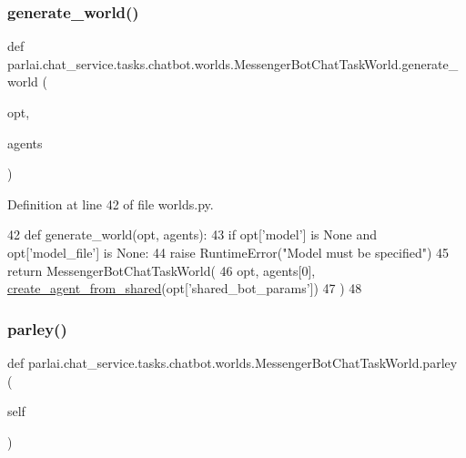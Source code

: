 \subsubsection{\texorpdfstring{generate\+\_\+world()}{generate\_world()}}
{\footnotesize\ttfamily def parlai.\+chat\+\_\+service.\+tasks.\+chatbot.\+worlds.\+Messenger\+Bot\+Chat\+Task\+World.\+generate\+\_\+world (\begin{DoxyParamCaption}\item[{}]{opt,  }\item[{}]{agents }\end{DoxyParamCaption})\hspace{0.3cm}{\ttfamily [static]}}



Definition at line 42 of file worlds.\+py.


\begin{DoxyCode}
42     \textcolor{keyword}{def }generate\_world(opt, agents):
43         \textcolor{keywordflow}{if} opt[\textcolor{stringliteral}{'model'}] \textcolor{keywordflow}{is} \textcolor{keywordtype}{None} \textcolor{keywordflow}{and} opt[\textcolor{stringliteral}{'model\_file'}] \textcolor{keywordflow}{is} \textcolor{keywordtype}{None}:
44             \textcolor{keywordflow}{raise} RuntimeError(\textcolor{stringliteral}{"Model must be specified"})
45         \textcolor{keywordflow}{return} MessengerBotChatTaskWorld(
46             opt, agents[0], \hyperlink{namespaceparlai_1_1core_1_1agents_aa5af5dd1d2f9da491b60348d479b849f}{create\_agent\_from\_shared}(opt[\textcolor{stringliteral}{'shared\_bot\_params'}])
47         )
48 
\end{DoxyCode}
\mbox{\label{classparlai_1_1chat__service_1_1tasks_1_1chatbot_1_1worlds_1_1MessengerBotChatTaskWorld_a3a6e3c07cd5d635cef46c04698d61618}} 
\subsubsection{\texorpdfstring{parley()}{parley()}}
{\footnotesize\ttfamily def parlai.\+chat\+\_\+service.\+tasks.\+chatbot.\+worlds.\+Messenger\+Bot\+Chat\+Task\+World.\+parley (\begin{DoxyParamCaption}\item[{}]{self }\end{DoxyParamCaption})}



